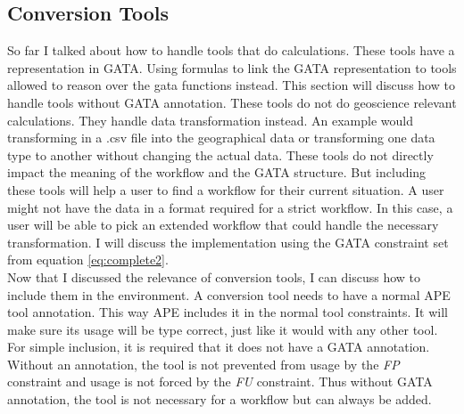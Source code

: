 \documentclass{article}
\begin{document}








\subsection{Conversion Tools}

So far I talked about how to handle tools that do calculations. These tools have a representation in GATA. Using formulas to link the GATA representation to tools allowed to reason over the gata functions instead. This section will discuss how to handle tools without GATA annotation. These tools do not do geoscience relevant calculations. They handle data transformation instead. An example would transforming in a .csv file into the geographical data or transforming one data type to another without changing the actual data. These tools do not directly impact the meaning of the workflow and the GATA structure. But including these tools will help a user to find a workflow for their current situation. A user might not have the data in a format required for a strict workflow. In this case, a user will be able to pick an extended workflow that could handle the necessary transformation. I will discuss the implementation using the GATA constraint set from equation \ref{eq:complete2}.
\\

Now that I discussed the relevance of conversion tools, I can discuss how to include them in the environment. A conversion tool needs to have a normal APE tool annotation. This way APE includes it in the normal tool constraints. It will make sure its usage will be type correct, just like it would with any other tool. For simple inclusion, it is required that it does not have a GATA annotation. Without an annotation, the tool is not prevented from usage by the \textit{FP} constraint and usage is not forced by the \textit{FU} constraint. Thus without GATA annotation, the tool is not necessary for a workflow but can always be added. 
\\
\end{document}
